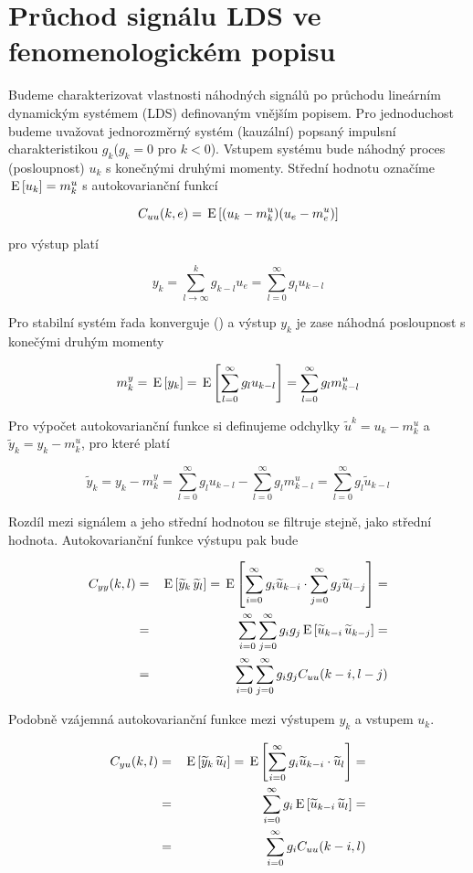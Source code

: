 \chapter{Průchod signálu LDS ve fenomenologickém popisu}
Budeme charakterizovat vlastnosti náhodných signálů po průchodu lineárním dynamickým systémem (LDS) definovaným vnějším popisem. Pro jednoduchost budeme uvažovat jednorozměrný systém (kauzální) popsaný impulsní charakteristikou $g_k$($g_k=0$ pro $k<0$). Vstupem systému bude náhodný proces (posloupnost) $u_k$ s konečnými druhými momenty. Střední hodnotu označíme $\,\mathrm{E}\left[u_k\right]=m_k^u$ s autokovarianční funkcí

\[ C_{uu}(k,e) = \,\mathrm{E}\left[(u_k-m_k^u)(u_e-m_e^u)\right] \]

pro výstup platí

\[ y_k = \sum_{l \to \infty}^k g_{k-l}u_e=\sum_{l=0}^{\infty} g_l u _{k-l} \]

Pro stabilní systém řada konverguje () a výstup $y_k$ je zase náhodná posloupnost s konečými druhým momenty

\[ m_k^y = \,\mathrm{E}\left[y_k\right]=\,\mathrm{E}\left[\sum_{l=0}^\infty g_l u_{k-l} \right] = \sum_{l=0}^\infty g_lm_{k-l}^u \]

Pro výpočet autokovarianční funkce si definujeme odchylky $\widetilde{u}^k=u_k-m_k^u$ a $\widetilde{y}_k=y_k-m_k^u$, pro které platí

\[
\widetilde{y}_k = y_k-m_k^y = \sum_{l=0}^\infty g_l u_{k-l}-\sum_{l=0}^\infty g_l m_{k-l}^u=\sum_{l=0}^\infty g_l \widetilde{u}_{k-l}
\]

Rozdíl mezi signálem a jeho střední hodnotou se filtruje stejně, jako střední hodnota. Autokovarianční funkce výstupu pak bude

\begin{eqnarray*}
C_{yy}(k,l) &=& \,\mathrm{E}\left[\widetilde{y}_k\, \widetilde{y}_l\right]=\,\mathrm{E}\left[ \sum_{i=0}^\infty g_i \widetilde{u}_{k-i}\cdot \sum_{j=0}^\infty g_j\widetilde{u}_{l-j} \right] = \\
& = & \sum_{i=0}^\infty \sum_{j=0}^\infty g_i g_j\,\mathrm{E}\left[\widetilde{u}_{k-i}\, \widetilde{u}_{k-j}\right] = \\
& = & \sum_{i=0}^\infty \sum_{j=0}^\infty g_i g_j C_{uu}(k-i,l-j)
\end{eqnarray*}

Podobně vzájemná autokovarianční funkce mezi výstupem $y_k$ a vstupem $u_k$.

\begin{eqnarray*}
C_{yu}(k,l) &=& \,\mathrm{E}\left[\widetilde{y}_k\, \widetilde{u}_l\right]=\,\mathrm{E}\left[ \sum_{i=0}^\infty g_i \widetilde{u}_{k-i}\cdot \widetilde{u}_l \right] = \\
& = & \sum_{i=0}^\infty g_i\,\mathrm{E}\left[\widetilde{u}_{k-i}\, \widetilde{u}_{l}\right] = \\
& = & \sum_{i=0}^\infty g_i  C_{uu}(k-i,l)
\end{eqnarray*}


